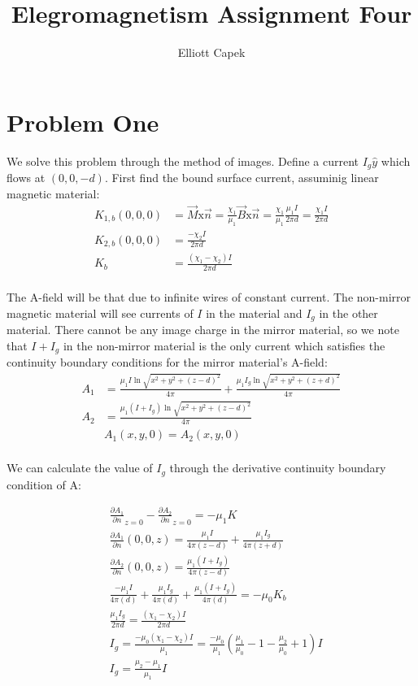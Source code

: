 \documentclass[10pt]{article} %
\title{Elegromagnetism Assignment Four}
\author{Elliott Capek}
\begin{document}
\maketitle{}

\section{Problem One}
We solve this problem through the method of images. Define a current $I_g\hat{y}$ which flows at $(0,0,-d)$. First find the bound surface current, assuminig linear magnetic material:\\

\begin{align*}
  K_{1,b}(0,0,0) &= \vec{M} \mbox{x} \vec{n} = \frac{\chi_1}{\mu_1}\vec{B} \mbox{x} \vec{n} = \frac{\chi_1}{\mu_1}\frac{\mu_1I}{2\pi d} = \frac{\chi_1I}{2\pi d}\\
  K_{2,b}(0,0,0) &= \frac{-\chi_2I}{2\pi d}\\
  K_{b} &= \frac{(\chi_1-\chi_2)I}{2\pi d}\\
\end{align*}

The A-field will be that due to infinite wires of constant current. The non-mirror magnetic material will see currents of $I$ in the material and $I_g$ in the other material. There cannot be any image charge in the mirror material, so we note that $I+I_g$ in the non-mirror material is the only current which satisfies the continuity boundary conditions for the mirror material's A-field:\\

\begin{align*}
  A_1 &= \frac{\mu_1I\ln{\sqrt{x^2+y^2+(z-d)^2}}}{4\pi} + \frac{\mu_1I_g\ln{\sqrt{x^2+y^2+(z+d)^2}}}{4\pi}\\
  A_2 &= \frac{\mu_1(I+I_g)\ln{\sqrt{x^2+y^2+(z-d)^2}}}{4\pi}\\
  &A_1(x,y,0) = A_2(x,y,0)\\
\end{align*}

We can calculate the value of $I_g$ through the derivative continuity boundary condition of A:

\begin{align*}
  &\frac{\partial A_1}{\partial n}_{z=0} - \frac{\partial A_2}{\partial n}_{z=0} = -\mu_1 K\\
  &\frac{\partial A_1}{\partial n}(0,0,z) = \frac{\mu_1I}{4\pi(z-d)} + \frac{\mu_1I_g}{4\pi(z+d)}\\
  &\frac{\partial A_2}{\partial n}(0,0,z) = \frac{\mu_1(I+I_g)}{4\pi(z-d)}\\
  &\frac{-\mu_1I}{4\pi(d)} + \frac{\mu_1I_g}{4\pi(d)} + \frac{\mu_1(I+I_g)}{4\pi(d)} = -\mu_0K_b\\
  &\frac{\mu_1I_g}{2\pi d} = \frac{(\chi_1-\chi_2)I}{2\pi d}\\
  &I_g = \frac{-\mu_0(\chi_1-\chi_2)I}{\mu_1} = \frac{-\mu_0}{\mu_1}\left(\frac{\mu_1}{\mu_0}-1-\frac{\mu_2}{\mu_0}+1\right)I\\
  &I_g = \frac{\mu_2-\mu_1}{\mu_1}I\\
\end{align*}
\end{document}
